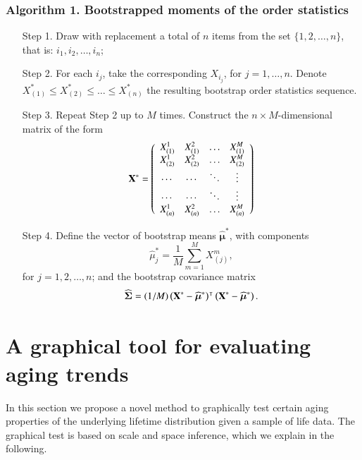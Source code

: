 \documentclass[preprint,12pt]{elsarticle}
\begin{document}
\subsubsection*{Algorithm 1. Bootstrapped moments of the order statistics}
\begin{enumerate}
\item[Step 1.] Draw with replacement a total of $n$ items from the set $\{1,2, \ldots, n\}$, that is: $i_1,i_2, \ldots, i_n$;
\item[Step 2.] For each $i_j$, take the corresponding $X_{i_j}$, for $j=1,\ldots, n$. Denote $X^*_{(1)} \leq X^*_{(2)}\leq  \ldots \leq X^*_{(n)}$ the resulting bootstrap order statistics sequence.  
\item[Step 3.] Repeat Step 2 up to $M$ times. Construct the $n \times M$-dimensional matrix of the form
$${\bf X}^*=\left(\begin{array} {cccc}
                     X^1_{(1)} & X^2_{(1)}&  \ldots & X^M_{(1)} \\
                     X^1_{(2)} & X^2_{(2)}&  \ldots & X^M_{(2)} \\
										 \cdots    & \cdots   &  \ddots  & \vdots    \\
										 \cdots    & \cdots   &  \ddots  & \vdots    \\
										 X^1_{(n)} & X^2_{(n)}&  \ldots & X^M_{(n)} \\
              \end{array}\right)$$
\item[Step 4.] Define the vector of bootstrap means $\widehat{\boldsymbol \mu}^*$, with components 
$$\widehat{ \mu}_j^*=\frac{1}{M}\sum_{m=1}^M X_{(j)}^m,$$
 for $j=1,2, \ldots, n$; and the bootstrap covariance matrix  
$$\widehat{\boldsymbol \Sigma}=(1/M)\left({\bf X}^*-\widehat{\boldsymbol \mu}^*\right)^{\intercal}\left({\bf X}^*-\widehat{\boldsymbol \mu}^*\right).$$
\end{enumerate}



\bigskip

\section{A graphical tool for evaluating aging trends}  \label{sizer1}
In this section we propose a novel method to graphically test certain aging properties of the underlying lifetime distribution given a sample of life data. The graphical test is based on scale and space inference, which we explain in the following.
\end{document}
